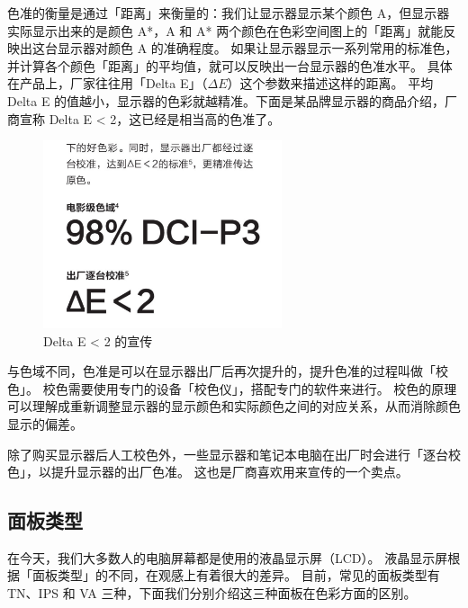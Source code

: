 色准的衡量是通过「距离」来衡量的：我们让显示器显示某个颜色 A，但显示器实际显示出来的是颜色 A*，A 和 A* 两个颜色在色彩空间图上的「距离」就能反映出这台显示器对颜色 A 的准确程度。
如果让显示器显示一系列常用的标准色，并计算各个颜色「距离」的平均值，就可以反映出一台显示器的色准水平。
具体在产品上，厂家往往用「Delta E」（$\Delta E$）这个参数来描述这样的距离。
平均 Delta E 的值越小，显示器的色彩就越精准。下面是某品牌显示器的商品介绍，厂商宣称 Delta E < 2，这已经是相当高的色准了。

\begin{figure}[htb!]
  \centering
  \includegraphics[width=7cm]{assets/Delta_E_below_2.png}
  \caption{Delta E < 2 的宣传}
  \label{Delta_E_below_2}
\end{figure}

与色域不同，色准是可以在显示器出厂后再次提升的，提升色准的过程叫做「校色」。
校色需要使用专门的设备「校色仪」，搭配专门的软件来进行。
校色的原理可以理解成重新调整显示器的显示颜色和实际颜色之间的对应关系，从而消除颜色显示的偏差。

除了购买显示器后人工校色外，一些显示器和笔记本电脑在出厂时会进行「逐台校色」，以提升显示器的出厂色准。
这也是厂商喜欢用来宣传的一个卖点。

\subsection{面板类型}

在今天，我们大多数人的电脑屏幕都是使用的液晶显示屏（LCD）。
液晶显示屏根据「面板类型」的不同，在观感上有着很大的差异。
目前，常见的面板类型有 TN、IPS 和 VA 三种，下面我们分别介绍这三种面板在色彩方面的区别。

